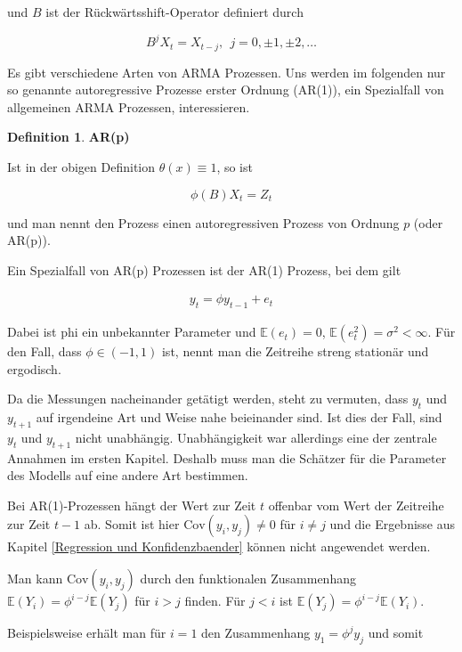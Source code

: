 \documentclass[12pt,a4paper]{article}
\theoremstyle{definition}
\newtheorem{Definition}{Definition}[subsection]
\theoremstyle{definition}
\theoremstyle{definition}
\theoremstyle{definition}
\begin{document}
und $B$ ist der Rückwärtsshift-Operator definiert durch

\begin{equation*}
B^j X_t = X_{t-j},~~ j = 0, \pm 1, \pm 2, \ldots
\end{equation*}

Es gibt verschiedene Arten von ARMA Prozessen. Uns werden im folgenden nur so genannte autoregressive Prozesse erster Ordnung (AR(1)), ein Spezialfall von allgemeinen ARMA Prozessen, interessieren.

\begin{Definition}
\textbf{AR(p)}

Ist in der obigen Definition $\theta(x) \equiv 1$, so ist 

\begin{equation*}
\phi(B) X_t = Z_t
\end{equation*}

und man nennt den Prozess einen autoregressiven Prozess von Ordnung $p$ (oder AR(p)).
\end{Definition}

Ein Spezialfall von AR(p) Prozessen ist der AR(1) Prozess, bei dem gilt

\begin{align}
y_t = \phi y_{t-1} + e_t
\end{align}

Dabei ist \gls{phi} ein unbekannter Parameter und $\mathbb{E}(e_t)=0$, $\mathbb{E}(e_t^2)=\sigma^2 < \infty$. Für den Fall, dass $\phi \in (-1,1)$ ist, nennt man die Zeitreihe streng stationär und ergodisch. 

Da die Messungen nacheinander getätigt werden, steht zu vermuten, dass $y_t$ und $y_{t+1}$ auf irgendeine Art und Weise nahe beieinander sind. Ist dies der Fall, sind $y_t$ und $y_{t+1}$ nicht unabhängig. Unabhängigkeit war allerdings eine der zentrale Annahmen im ersten Kapitel. Deshalb muss man die Schätzer für die Parameter des Modells auf eine andere Art bestimmen.

Bei AR(1)-Prozessen hängt der Wert zur Zeit $t$ offenbar vom Wert der Zeitreihe zur Zeit $t-1$ ab. Somit ist hier $\text{Cov}(y_i,y_j) \neq 0$ für $i \neq j$ und die Ergebnisse aus Kapitel \ref{Regression und Konfidenzbaender} können nicht angewendet werden. 

Man kann $\text{Cov}(y_i,y_j)$ durch den funktionalen Zusammenhang $\mathbb{E}(Y_i) = \phi^{i-j} \mathbb{E}(Y_{j})$ für $i>j$ finden. Für $j<i$ ist $\mathbb{E}(Y_j) = \phi^{i-j} \mathbb{E}(Y_i)$. 

Beispielsweise erhält man für $i=1$ den Zusammenhang $y_1 = \phi^j y_j$ und somit
\end{document}

